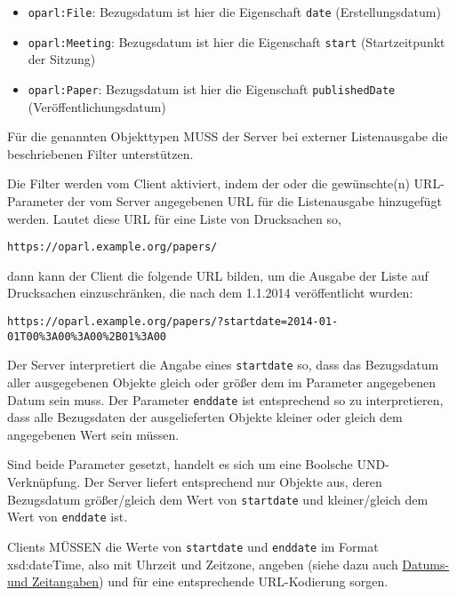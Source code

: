\documentclass[,a4paper]{article}
\begin{document}
\begin{itemize}
\itemsep1pt\parskip0pt
\item
  \texttt{oparl:File}: Bezugsdatum ist hier die Eigenschaft
  \texttt{date} (Erstellungsdatum)
\item
  \texttt{oparl:Meeting}: Bezugsdatum ist hier die Eigenschaft
  \texttt{start} (Startzeitpunkt der Sitzung)
\item
  \texttt{oparl:Paper}: Bezugsdatum ist hier die Eigenschaft
  \texttt{publishedDate} (Veröffentlichungsdatum)
\end{itemize}

Für die genannten Objekttypen MUSS der Server bei externer Listenausgabe
die beschriebenen Filter unterstützen.

Die Filter werden vom Client aktiviert, indem der oder die gewünschte(n)
URL-Parameter der vom Server angegebenen URL für die Listenausgabe
hinzugefügt werden. Lautet diese URL für eine Liste von Drucksachen so,

\begin{verbatim}
https://oparl.example.org/papers/
\end{verbatim}

dann kann der Client die folgende URL bilden, um die Ausgabe der Liste
auf Drucksachen einzuschränken, die nach dem 1.1.2014 veröffentlicht
wurden:

\begin{verbatim}
https://oparl.example.org/papers/?startdate=2014-01-01T00%3A00%3A00%2B01%3A00
\end{verbatim}

Der Server interpretiert die Angabe eines \texttt{startdate} so, dass
das Bezugsdatum aller ausgegebenen Objekte gleich oder größer dem im
Parameter angegebenen Datum sein muss. Der Parameter \texttt{enddate}
ist entsprechend so zu interpretieren, dass alle Bezugsdaten der
ausgelieferten Objekte kleiner oder gleich dem angegebenen Wert sein
müssen.

Sind beide Parameter gesetzt, handelt es sich um eine Boolsche
UND-Verknüpfung. Der Server liefert entsprechend nur Objekte aus, deren
Bezugsdatum größer/gleich dem Wert von \texttt{startdate} und
kleiner/gleich dem Wert von \texttt{enddate} ist.

Clients MÜSSEN die Werte von \texttt{startdate} und \texttt{enddate} im
Format xsd:dateTime, also mit Uhrzeit und Zeitzone, angeben (siehe dazu
auch \hyperref[datumux5fzeit]{Datums- und Zeitangaben}) und für eine
entsprechende URL-Kodierung sorgen.
\end{document}
